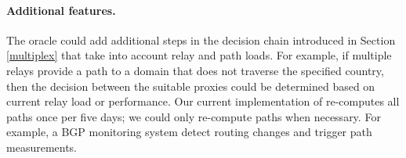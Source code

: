 \paragraph{Additional \system{} features.}  
The oracle could add additional steps in the decision
chain introduced in Section \ref{multiplex} that take into account
relay and path loads.  For example, if multiple relays provide a path
to a domain that does not traverse the specified country, then the
decision between the suitable proxies could be determined based on
current relay load or performance.  Our current implementation of
\system{} re-computes all paths once per five days; we could only
re-compute paths when necessary.  For example, a BGP monitoring system
detect routing changes and trigger path measurements.

